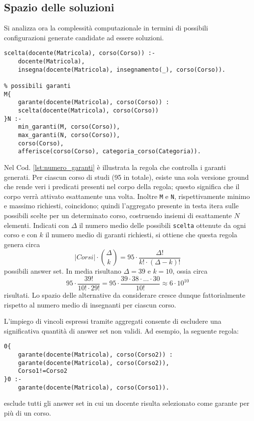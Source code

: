 \subsection{Spazio delle soluzioni}

Si analizza ora la complessità computazionale in termini di
possibili configurazioni generate candidate ad essere soluzioni.

\begin{lstlisting}[style=asp, caption={Frammento del file \texttt{main.lp}.}, label={lst:numero_garanti}]
scelta(docente(Matricola), corso(Corso)) :-
	docente(Matricola),
	insegna(docente(Matricola), insegnamento(_), corso(Corso)).

% possibili garanti
M{
	garante(docente(Matricola), corso(Corso)) :
	scelta(docente(Matricola), corso(Corso))
}N :-
	min_garanti(M, corso(Corso)),
	max_garanti(N, corso(Corso)),
	corso(Corso),
	afferisce(corso(Corso), categoria_corso(Categoria)).
\end{lstlisting}
Nel Cod. \ref{lst:numero_garanti} è illustrata la regola che controlla i garanti
generati. Per ciascun corso di studi (95 in totale), esiste una sola versione ground che rende veri i
predicati presenti nel corpo della regola; questo significa che il corpo verrà
attivato esattamente una volta. Inoltre \texttt{M} e \texttt{N},
rispettivamente minimo e massimo richiesti, coincidono; quindi l'aggregato
presente in testa itera sulle possibili scelte per un determinato corso,
costruendo insiemi di esattamente $N$ elementi. Indicati con $\Delta$ il numero
medio delle possibili \texttt{scelta} ottenute da ogni corso e con $k$ il numero medio di garanti richiesti, si ottiene che questa regola genera circa
\[
	|\mathit{Corsi}| \cdot \binom{\Delta}{k}
	= 95 \cdot \frac{\Delta !}{k! \cdot (\Delta - k)!}
\]
possibili answer set. In media risultano $\Delta = 39 \text{ e } k=10$, ossia
circa  
\[
	95 \cdot \frac{39!}{10! \cdot 29!} = 95 \cdot \frac{39 \cdot 38 \cdot \ldots \cdot 30}{10!}
	\approx
	6 \cdot 10^{10}
\]
risultati. Lo spazio delle alternative da considerare cresce dunque fattorialmente rispetto al
numero medio di insegnanti per ciascun corso.

L’impiego di vincoli espressi tramite aggregati consente di escludere una
significativa quantità di answer set non validi. Ad esempio, la seguente regola:
\begin{lstlisting}[style=asp, caption={Frammento del file \texttt{main.lp}.}, label={lst:max_volte_garante}]
% un docente e' scelto al piu' una volta
0{
	garante(docente(Matricola), corso(Corso2)) :
	garante(docente(Matricola), corso(Corso2)),
	Corso1!=Corso2
}0 :-
	garante(docente(Matricola), corso(Corso1)).
\end{lstlisting}
esclude tutti gli answer set in cui un docente risulta selezionato come garante
per più di un corso. 

